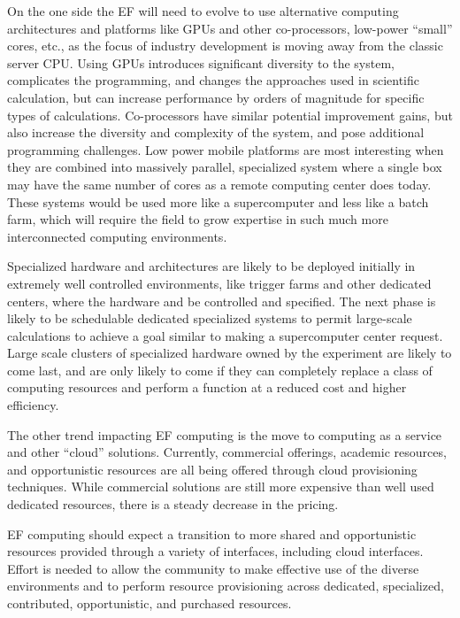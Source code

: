 On the one side the EF will need to evolve to use alternative computing
architectures and platforms like GPUs and other co-processors,  low-power
``small'' cores, etc., as the focus of industry development is moving away from
the classic server CPU.  Using GPUs introduces significant diversity to the
system, complicates the programming, and changes the approaches used in
scientific calculation, but can increase performance by orders of magnitude
for specific types of calculations.  Co-processors have similar potential
improvement gains, but also increase the diversity and complexity of the
system, and pose additional programming challenges.  Low power mobile
platforms are most interesting when they are combined into massively parallel,
specialized system where a single box may have the same number of cores as a
remote computing center does today.  These systems would be used more like a
supercomputer and less like a batch farm, which will require the field to
grow expertise in such much more interconnected computing environments.

Specialized hardware and architectures are likely to be deployed initially in
extremely well controlled environments, like trigger farms and other dedicated
centers, where the hardware and be controlled and specified. The next phase is
likely to be schedulable dedicated specialized systems to permit large-scale
calculations to achieve a goal similar to making a supercomputer center
request.  Large scale clusters of specialized hardware owned by the experiment
are likely to come last, and are only likely to come if they can completely
replace a class of computing resources and perform a function at a reduced
cost and higher efficiency.

The other trend impacting EF computing is the move to computing as a service
and other ``cloud'' solutions.  Currently,  commercial offerings, academic
resources, and opportunistic resources are all being offered through cloud
provisioning techniques.  While commercial solutions are still more expensive
than well used dedicated resources, there is a steady decrease in the pricing.

EF computing should expect a transition to more shared and opportunistic
resources provided through a variety of interfaces, including cloud
interfaces.   Effort is needed to allow the community to make effective use of
the diverse environments and to perform resource provisioning across
dedicated, specialized, contributed, opportunistic, and purchased resources.

